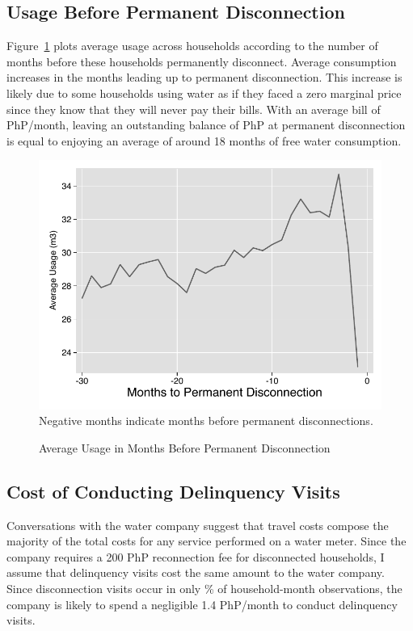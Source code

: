 \documentclass[12pt]{article}
\begin{document}
\subsection{Usage Before Permanent Disconnection}\label{appendix:permanentdc}

Figure~\ref{figure:dc_permanent} plots average usage across households according to the number of months before these households permanently disconnect. Average consumption increases in the months leading up to permanent disconnection.  This increase is likely due to some households using water as if they faced a zero marginal price since they know that they will never pay their bills.  With an average bill of PhP/month, leaving an outstanding balance of PhP at permanent disconnection is equal to enjoying an average of around 18 months of free water consumption.

\begin{figure}[H]
\centering
\caption{Average Usage in Months Before Permanent Disconnection}\label{figure:dc_permanent}
\includegraphics[scale=.7]{tables/line_disc_graph.pdf} \\
{ \footnotesize Negative months indicate months before permanent disconnections. }
\end{figure}

\subsection{Cost of Conducting Delinquency Visits}\label{appendix:visitcosts}

Conversations with the water company suggest that travel costs compose the majority of the total costs for any service performed on a water meter.  Since the company requires a 200 PhP reconnection fee for disconnected households, I assume that delinquency visits cost the same amount to the water company.  Since disconnection visits occur in only \unskip\% of household-month observations, the company is likely to spend a negligible 1.4 PhP/month to conduct delinquency visits.
\end{document}
